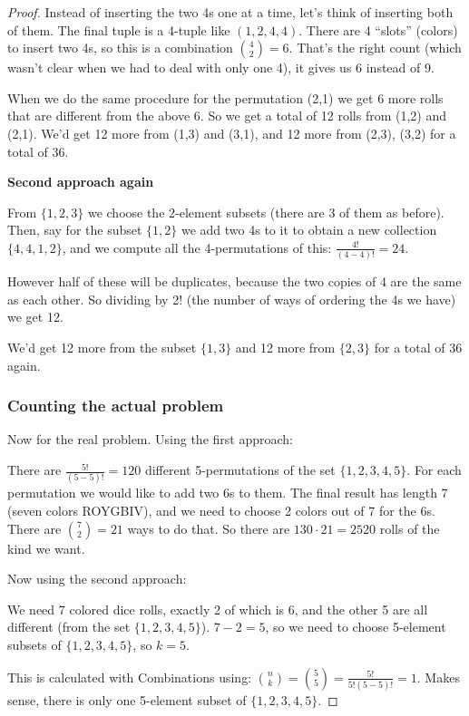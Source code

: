 \documentclass[14pt]{extarticle}
\begin{document}
\begin{proof}
Instead of inserting the two 4s one at a time, let's think of inserting both of them. The final tuple is a 4-tuple like $(1,2,4,4)$. There are 4 ``slots'' (colors) to insert two 4s, so this is a combination $\binom{4}{2} = 6$. That's the right count (which wasn't clear when we had to deal with only one 4), it gives us 6 instead of 9.

When we do the same procedure for the permutation (2,1) we get 6 more rolls that are different from the above 6. So we get a total of 12 rolls from (1,2) and (2,1). We'd get 12 more from (1,3) and (3,1), and 12 more from (2,3), (3,2) for a total of 36.

{\bf Second approach again}

From $\{1,2,3\}$ we choose the 2-element subsets (there are 3 of them as before). Then, say for the subset $\{1,2\}$ we add two 4s to it to obtain a new collection $\{4,4,1,2\}$, and we compute all the 4-permutations of this: $\frac{4!}{(4-4)!} = 24$. 

However half of these will be duplicates, because the two copies of 4 are the same as each other. So dividing by 2! (the number of ways of ordering the 4s we have) we get 12.

We'd get 12 more from the subset $\{1,3\}$ and 12 more from $\{2,3\}$ for a total of 36 again.

\subsubsection{Counting the actual problem}
Now for the real problem. Using the first approach:

There are $\frac{5!}{(5-5)!} = 120$ different 5-permutations of the set $\{1,2,3,4,5\}$. For each permutation we would like to add two 6s to them. The final result has length 7 (seven colors ROYGBIV), and we need to choose 2 colors out of 7 for the 6s. There are $\binom{7}{2} = 21$ ways to do that. So there are $130 \cdot 21 = 2520$ rolls of the kind we want.

Now using the second approach:

We need 7 colored dice rolls, exactly 2 of which is 6, and the other 5 are all different (from the set $\{1,2,3,4,5\}$). $7-2 = 5$, so we need to choose 5-element subsets of $\{1,2,3,4,5\}$, so $k = 5$. 

This is calculated with Combinations using: $\binom{n}{k} = \binom{5}{5} = \frac{5!}{5!(5-5)!} = 1$. Makes sense, there is only one 5-element subset of $\{1,2,3,4,5\}$.


\end{proof}
\end{document}
